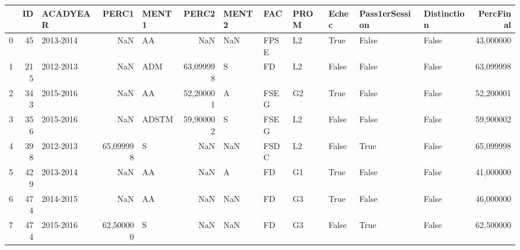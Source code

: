 \begin{tabular}{lrlrlrllllllr}
\toprule
{} &   ID &   ACADYEAR &      PERC1 &  MENT1 &      PERC2 & MENT2 &   FAC & PROM &  Echec & Pass1erSession & Distinction &  PercFinal \\
\midrule
0 &   45 &  2013-2014 &        NaN &     AA &        NaN &   NaN &  FPSE &   L2 &   True &          False &       False &  43,000000 \\
1 &  215 &  2012-2013 &        NaN &    ADM &  63,099998 &     S &    FD &   L2 &  False &          False &       False &  63,099998 \\
2 &  343 &  2015-2016 &        NaN &     AA &  52,200001 &     A &  FSEG &   G2 &   True &          False &       False &  52,200001 \\
3 &  356 &  2015-2016 &        NaN &  ADSTM &  59,900002 &     S &  FSEG &   L2 &  False &          False &       False &  59,900002 \\
4 &  398 &  2012-2013 &  65,099998 &      S &        NaN &   NaN &  FSDC &   L2 &  False &           True &       False &  65,099998 \\
5 &  429 &  2013-2014 &        NaN &     AA &        NaN &     A &    FD &   G1 &   True &          False &       False &  41,000000 \\
6 &  474 &  2014-2015 &        NaN &     AA &        NaN &   NaN &    FD &   G3 &   True &          False &       False &  46,000000 \\
7 &  474 &  2015-2016 &  62,500000 &      S &        NaN &   NaN &    FD &   G3 &  False &           True &       False &  62,500000 \\
\bottomrule
\end{tabular}
